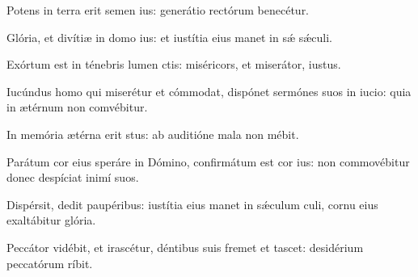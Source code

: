 \item {}

\item Potens in terra erit semen ius:\psstar{} generátio rectórum benecétur.

\item Glória, et divítiæ in domo ius:\psstar{} et iustítia eius manet in sǽ sǽculi.

\item Exórtum est in ténebris lumen ctis:\psstar{} miséricors, et miserátor,  iustus.

\item Iucúndus homo qui miserétur et cómmodat,\pscross{} dispónet sermónes suos in iucio:\psstar{} quia in ætérnum non comvébitur.

\item In memória ætérna erit stus:\psstar{} ab auditióne mala non mébit.

\item Parátum cor eius speráre in Dómino,\pscross{} confirmátum est cor ius:\psstar{} non commovébitur donec despíciat inimí suos.

\item Dispérsit, dedit paupéribus:\pscross{} iustítia eius manet in sǽculum culi,\psstar{} cornu eius exaltábitur  glória.

\item Peccátor vidébit, et irascétur,\pscross{} déntibus suis fremet et tascet:\psstar{} desidérium peccatórum ríbit.